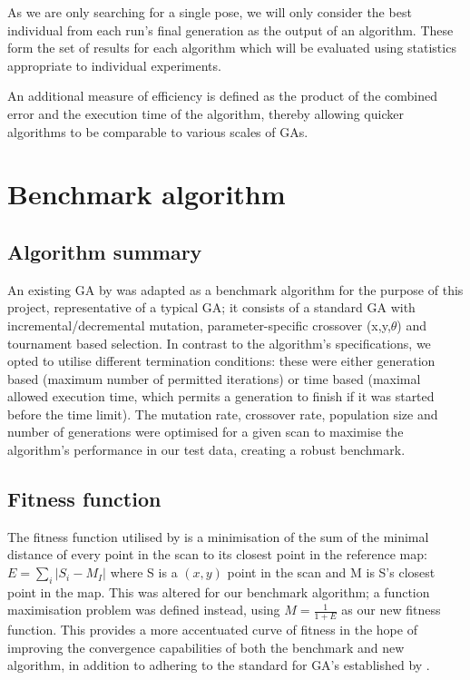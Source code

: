 \documentclass[authoryearcitations]{UoYCSproject}
\begin{document}
As we are only searching for a single pose, we will only consider the best individual from each run's final generation as the output of an algorithm. These form the set of results for each algorithm which will be evaluated using statistics appropriate to individual experiments. \newline

An additional measure of efficiency is defined as the product of the combined error and the execution time of the algorithm, thereby allowing quicker algorithms to be comparable to various scales of GAs.

\chapter{Benchmark algorithm}
\section{Algorithm summary}
An existing GA by \citet{Robertson2002-ou} was adapted as a benchmark algorithm for the purpose of this project, representative of a typical GA; it consists of a standard GA with incremental/decremental mutation, parameter-specific crossover (x,y,$\theta$) and tournament based selection. In contrast to the algorithm's specifications, we opted to utilise different termination conditions: these were either generation based (maximum number of permitted iterations) or time based (maximal allowed execution time, which permits a generation to finish if it was started before the time limit). The mutation rate, crossover rate, population size and number of generations were optimised for a given scan to maximise the algorithm's performance in our test data, creating a robust benchmark.

\section{Fitness function}
\label{sec:fitness_landscape}
The fitness function utilised by \citet{Robertson2002-ou} is a minimisation of the sum of the minimal distance of every point in the scan to its closest point in the reference map: $E = \sum_i |S_i-M_I|$ where S is a $(x,y)$ point in the scan and M is S's closest point in the map. This was altered for our benchmark algorithm; a function maximisation problem was defined instead, using $M = \frac{1}{1+E}$ as our new fitness function. This provides a more accentuated curve of fitness in the hope of improving the convergence capabilities of both the benchmark and new algorithm, in addition to adhering to the standard for GA's established by \citet{Eiben2015-de}. \newline
\end{document}
